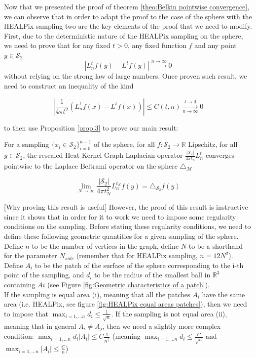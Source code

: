 Now that we presented the proof of theorem \ref{theo:Belkin pointwise convergence}, we can observe that in order to adapt the proof to the case of the sphere with the HEALPix sampling  two are the key elements of the proof that we need to modify. First, due to the deterministic nature of the HEALPix sampling on the sphere, we need to prove that for any fixed $t>0$, any fixed function $f$ and any point $y\in\mathcal S_2$ $$\left|L_n^tf(y)-L^tf(y)\right|\xrightarrow{n\to \infty} 0$$ without relying on the strong law of large numbers. Once proven such result, we need to construct an inequality of the kind

$$\left|\frac{1}{4\pi t^2}\left(L_n^tf(x) - L^tf(x)\right)\right|\leq C(t, n)\xrightarrow[n\to \infty]{t\to 0}0$$

to then use Proposition \ref{prop:3} to prove our main result:
\vspace{1cm}
\begin{theorem}
	For a sampling $\{x_i\in\mathcal S_2\}_{i=0}^{n-1}$ of the sphere, for all $f: \mathcal S_2 \rightarrow \mathbb R$ Lipschitz, for all $y\in\mathcal S_2$, the rescaled Heat Kernel Graph Laplacian operator $\frac{|\mathcal S_2|}{4\pi t_n}L^t_n$ converges pointwise to the Laplace Beltrami operator on the sphere $\triangle_{\mathcal M}$
	
	$$ \lim_{N\to\infty}\frac{|\mathcal S_2|}{4\pi t_N^2} L_n^{t_N}f(y) =  \triangle_{\mathcal S_2}f(y) $$
	\label{theo:pointwise convergence in the healpix case}
\end{theorem}
\vspace{1cm}

[Why proving this result is useful] However, the proof of this result is instructive since it shows that in order for it to work we need to impose some regularity conditions on the sampling. Before stating these regularity conditions, we need to define these following geometric quantities for a given sampling of the sphere. Define $n$ to be the number of vertices in the graph, define $N$ to be a shorthand for the parameter $N_{side}$ (remember that for HEALPix sampling, $n=12N^2$). Define $A_i$ to be the patch of the surface of the sphere corresponding to the i-th point of the sampling, and $d_i$ to be the radius of the smallest ball in $\mathbb R^3$ containing $Ai$ (see Figure \ref{fig:Geometric characteristics of a patch}). \\
If the sampling is equal area (i), meaning that all the patches $A_i$ have the same area (i.e. HEALPix, see figure \ref{fig:HEALPix equal areas patches}), then we need to impose that $ \max_{i=1,...n} d_i \leq \frac{1}{\sqrt{n}}$. If the sampling is not equal area (ii), meaning that in general $A_i\neq A_j$, then we need a slightly more complex condition: $\max_{i=1,...n}d_i|A_i|\leq C\frac{1}{n^\frac{3}{2}}$ (meaning $\max_{i=1,...n} d_i \leq \frac{C}{\sqrt{n}}$ and $\max_{i=1,...n} |A_i| \leq \frac{C}{n}$)\\

